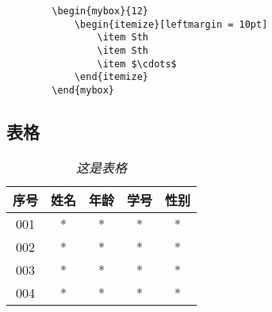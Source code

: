 \documentclass[a4paper, 12pt, UTF8]{ctexart}
\begin{document}
\begin{listing}[ht]
    \begin{verbatim}
        \begin{mybox}{12}
            \begin{itemize}[leftmargin = 10pt]
                \item Sth
                \item Sth
                \item $\cdots$
            \end{itemize}
        \end{mybox}
    \end{verbatim}
    \caption{\em mybox}
    \label{mybox}
\end{listing}

\clearpage
\subsection{表格}
\begin{table}[ht]
    \centering
        \caption{\em 这是表格}
        \vskip 0.1in
        \label{table}
        \begin{tabular}{c|cccc}
          \hline
          \hline
          \rule{0pt}{3ex}
          序号 & 姓名 & 年龄 & 学号 & 性别 
                                     \rule[-1.2ex]{0pt}{0pt} \\\hline
          001 & *  &  *  & *  & * \\ 
          002 & *  &  *  & *  & * \\
          003 & *  &  *  & *  & * \\      
          004 & *  &  *  & *  & * \\
          \hline
          \hline 
        \end{tabular}
\end{table}
\end{document}
